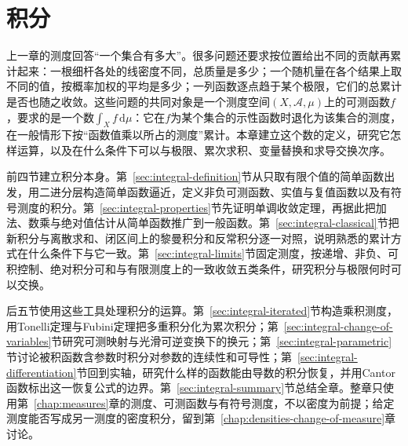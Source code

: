 \chapter{积分}
\label{chap:integration}

上一章的测度回答“一个集合有多大”。很多问题还要求按位置给出不同的贡献再累计起来：一根细杆各处的线密度不同，总质量是多少；一个随机量在各个结果上取不同的值，按概率加权的平均是多少；一列函数逐点趋于某个极限，它们的总累计是否也随之收敛。这些问题的共同对象是一个测度空间$(X,\mathcal A,\mu)$上的可测函数$f$，要求的是一个数$\int_Xf\,\mathrm d\mu$：它在$f$为某个集合的示性函数时退化为该集合的测度，在一般情形下按“函数值乘以所占的测度”累计。本章建立这个数的定义，研究它怎样运算，以及在什么条件下可以与极限、累次求积、变量替换和求导交换次序。

前四节建立积分本身。第~\ref{sec:integral-definition}节从只取有限个值的简单函数出发，用二进分层构造简单函数逼近，定义非负可测函数、实值与复值函数以及有符号测度的积分。第~\ref{sec:integral-properties}节先证明单调收敛定理，再据此把加法、数乘与绝对值估计从简单函数推广到一般函数。第~\ref{sec:integral-classical}节把新积分与离散求和、闭区间上的黎曼积分和反常积分逐一对照，说明熟悉的累计方式在什么条件下与它一致。第~\ref{sec:integral-limits}节固定测度，按递增、非负、可积控制、绝对积分可和与有限测度上的一致收敛五类条件，研究积分与极限何时可以交换。

后五节使用这些工具处理积分的运算。第~\ref{sec:integral-iterated}节构造乘积测度，用Tonelli定理与Fubini定理把多重积分化为累次积分；第~\ref{sec:integral-change-of-variables}节研究可测映射与光滑可逆变换下的换元；第~\ref{sec:integral-parametric}节讨论被积函数含参数时积分对参数的连续性和可导性；第~\ref{sec:integral-differentiation}节回到实轴，研究什么样的函数能由导数的积分恢复，并用Cantor函数标出这一恢复公式的边界。第~\ref{sec:integral-summary}节总结全章。整章只使用第~\ref{chap:measures}章的测度、可测函数与有符号测度，不以密度为前提；给定测度能否写成另一测度的密度积分，留到第~\ref{chap:densities-change-of-measure}章讨论。










